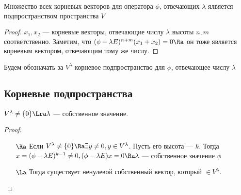 \begin{proposition}
    Множество всех корневых векторов для оператора \(\phi\), отвечающих \(\lambda\) ялвяется подпространством пространства \(V\)
\end{proposition}
\begin{proof}
    \(x_1, x_2\) --- корневые векторы, отвечающие числу \(\lambda\) высоты \(n, m\) соответственно. Заметим, что \((\phi - \lambda E)^{n + m}(x_1 + x_2) = 0 \Ra\) он тоже является корневым вектором, отвечающим тому же числу.
\end{proof}
\begin{definition}
    Будем обозначать за \(V^\lambda\) корневое подпространство для \(\phi\), отвечающее числу \(\lambda\)
\end{definition}

\subsection{Корневые подпространства}
\begin{proposition}
    \(V^\lambda \ne \{0\} \Lra \lambda\) --- собственное значение.
\end{proposition}
\begin{proof}\indent
    \begin{enumerate}
        \item[\(\Ra\)] Если \(V^\lambda \ne \{0\} \Ra \exists y \ne 0, y \in V^\lambda\). Пусть его высота --- \(k\). Тогда \(x = (\phi - \lambda E)^{k - 1} \ne 0, (\phi - \lambda E)x = 0 \Ra \lambda\) --- собственное значение \(\phi\)
        \item[\(\La\)] Тогда существует ненулевой собственный вектор, который \(\in V^\lambda\).
    \end{enumerate}
\end{proof}

